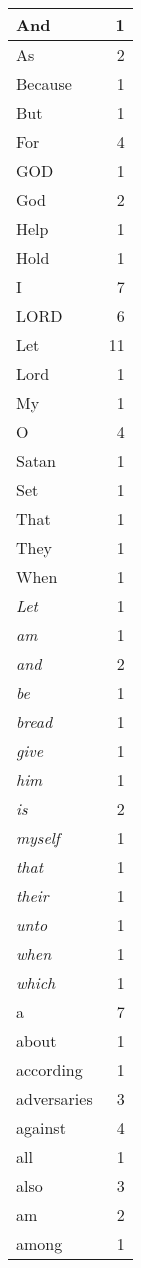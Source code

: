 \begin{center}
\begin{longtable}{l|r}
\hline \hline
\endlastfoot
And & 1 \\ \hline
As & 2 \\ \hline
Because & 1 \\ \hline
But & 1 \\ \hline
For & 4 \\ \hline
GOD & 1 \\ \hline
God & 2 \\ \hline
Help & 1 \\ \hline
Hold & 1 \\ \hline
I & 7 \\ \hline
LORD & 6 \\ \hline
Let & 11 \\ \hline
Lord & 1 \\ \hline
My & 1 \\ \hline
O & 4 \\ \hline
Satan & 1 \\ \hline
Set & 1 \\ \hline
That & 1 \\ \hline
They & 1 \\ \hline
When & 1 \\ \hline
\emph{Let} & 1 \\ \hline
\emph{am} & 1 \\ \hline
\emph{and} & 2 \\ \hline
\emph{be} & 1 \\ \hline
\emph{bread} & 1 \\ \hline
\emph{give} & 1 \\ \hline
\emph{him} & 1 \\ \hline
\emph{is} & 2 \\ \hline
\emph{myself} & 1 \\ \hline
\emph{that} & 1 \\ \hline
\emph{their} & 1 \\ \hline
\emph{unto} & 1 \\ \hline
\emph{when} & 1 \\ \hline
\emph{which} & 1 \\ \hline
a & 7 \\ \hline
about & 1 \\ \hline
according & 1 \\ \hline
adversaries & 3 \\ \hline
against & 4 \\ \hline
all & 1 \\ \hline
also & 3 \\ \hline
am & 2 \\ \hline
among & 1 \\ \hline

\end{longtable}
\end{center}
